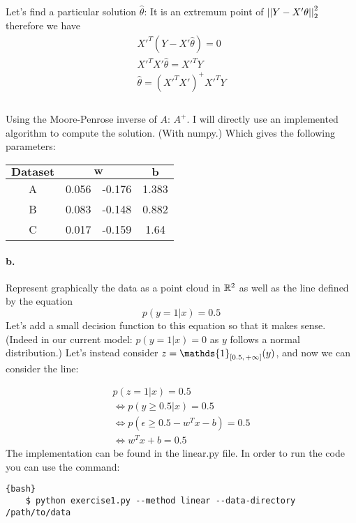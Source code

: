 \documentclass{article}
\begin{document}
Let's find a particular solution $\widehat\theta$: It is an extremum point of $\left|\left| Y - X'\theta \right|\right|_2^2$ therefore we have
\begin{equation*}
    \begin{aligned}
        X'^T (Y - X'\widehat\theta) = 0              \\
        X'^T X' \widehat\theta = X'^T Y              \\
        \boxed{\widehat\theta = (X'^T X')^{+}X'^T Y} \\
    \end{aligned}
\end{equation*}\\
Using the Moore-Penrose inverse of $A$: $A^{+}$. I will directly use an implemented algorithm to compute the solution. (With numpy.)
Which gives the following parameters:
\begin{tabular}{| c || c | c | c |}
    \hline
    $\mathbf{Dataset}$ & \multicolumn{2}{|c|}{$\mathbf{w}$} & $\mathbf{b}$         \\
    \hline
    A                  & 0.056                              & -0.176       & 1.383 \\
    \hline
    B                  & 0.083                              & -0.148       & 0.882 \\
    \hline
    C                  & 0.017                              & -0.159       & 1.64  \\
    \hline
\end{tabular}

\paragraph{b.} Represent graphically the data as a point cloud in $\mathbb{R}^2$ as well as the line defined by the equation
\begin{equation*}
    p(y=1|x)=0.5
\end{equation*}
Let's add a small decision function to this equation so that it makes sense.
(Indeed in our current model: $p(y=1 | x) = 0$ as $y$ follows a normal distribution.) Let's instead consider $z = \mathds{1}_{\inter{0.5}{+\infty}}(y)$, and
now we can consider the line:

\begin{equation*}
    \begin{aligned}
        p(z=1|x) = 0.5                                       \\
        \Leftrightarrow p(y \ge 0.5|x) = 0.5                 \\
        \Leftrightarrow p(\epsilon \ge 0.5 - w^Tx - b) = 0.5 \\
        \Leftrightarrow w^Tx + b = 0.5
    \end{aligned}
\end{equation*}
The implementation can be found in the linear.py file. In order to run the code you can use the command:
\begin{lstlisting}{bash}
    $ python exercise1.py --method linear --data-directory /path/to/data
\end{lstlisting}
\end{document}
